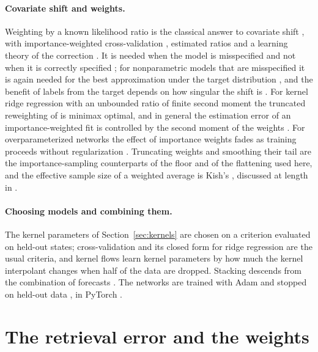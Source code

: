 \documentclass[11pt]{article}
\theoremstyle{remark}
\newcommand{\1}{\mathbf{1}}
\begin{document}
\paragraph{Covariate shift and weights.} Weighting by a known likelihood ratio is the classical answer to covariate
shift \cite{shimodaira,sugiyamabook,quionero2009}, with importance-weighted cross-validation \cite{sugiyama2007},
estimated ratios \cite{huang2007} and a learning theory of the correction \cite{cortes2008,cortes}. It is needed when
the model is misspecified and not when it is correctly specified \cite{shimodaira}; for nonparametric models that are
misspecified it is again needed for the best approximation under the target distribution \cite{gogolashvili}, and the
benefit of labels from the target depends on how singular the shift is \cite{kpotufe2021}. For kernel ridge regression
with an unbounded ratio of finite second moment the truncated reweighting of \cite{mpw} is minimax optimal, and in
general the estimation error of an importance-weighted fit is controlled by the second moment of the weights
\cite{cortes}. For overparameterized networks the effect of importance weights fades as training proceeds without
regularization \cite{byrdlipton}. Truncating weights \cite{ionides2008} and smoothing their tail \cite{psis} are the
importance-sampling counterparts of the floor and of the flattening used here, and the effective sample size of a
weighted average is Kish's \cite{kish}, discussed at length in \cite{elvira2022}.

\paragraph{Choosing models and combining them.} The kernel parameters of Section~\ref{sec:kernels} are chosen on a
criterion evaluated on held-out states; cross-validation \cite{stonecv,arlot} and its closed form for ridge regression
\cite{gcv} are the usual criteria, and kernel flows \cite{owhadiyoo,hamziowhadi} learn kernel parameters by how much
the kernel interpolant changes when half of the data are dropped. Stacking \cite{wolpert,breiman} descends from the combination of forecasts
\cite{batesgranger}. The networks are trained with Adam \cite{adam} and stopped on held-out data \cite{prechelt}, in
PyTorch \cite{pytorch}.

\section{The retrieval error and the weights}\label{sec:setting}
\end{document}
